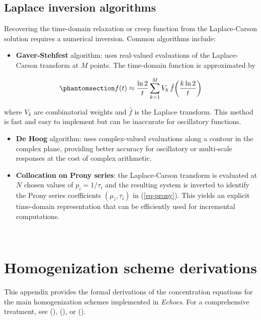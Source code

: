\documentclass[
  a4paper,
  numbers=noendperiod,
  DIV=12]{scrreprt}
\providecommand{\tightlist}{%
  \setlength{\itemsep}{0pt}\setlength{\parskip}{0pt}}
\begin{document}
\section{Laplace inversion algorithms}\label{sec-laplace-inversion}

Recovering the time-domain relaxation or creep function from the
Laplace-Carson solution requires a numerical inversion. Common
algorithms include:

\begin{itemize}
\tightlist
\item
  \textbf{Gaver-Stehfest} algorithm: uses real-valued evaluations of the
  Laplace-Carson transform at \(M\) points. The time-domain function is
  approximated by
\end{itemize}

\begin{equation}\protect\phantomsection\label{eq-stehfest}{
f(t) \approx \frac{\ln 2}{t} \sum_{k=1}^{M} V_k \, \hat{f}\!\left(\frac{k\ln 2}{t}\right)
}\end{equation}

where \(V_k\) are combinatorial weights and \(\hat{f}\) is the Laplace
transform. This method is fast and easy to implement but can be
inaccurate for oscillatory functions.

\begin{itemize}
\item
  \textbf{De Hoog} algorithm: uses complex-valued evaluations along a
  contour in the complex plane, providing better accuracy for
  oscillatory or multi-scale responses at the cost of complex
  arithmetic.
\item
  \textbf{Collocation on Prony series}: the Laplace-Carson transform is
  evaluated at \(N\) chosen values of \(p_i = 1/\tau_i\) and the
  resulting system is inverted to identify the Prony series coefficients
  \((\mu_i, \tau_i)\) in (\ref{eq-prony}). This yields an explicit
  time-domain representation that can be efficiently used for
  incremental computations.
\end{itemize}

\(\,\)

\chapter{Homogenization scheme
derivations}\label{sec-scheme-derivations}

This appendix provides the formal derivations of the concentration
equations for the main homogenization schemes implemented in
\emph{Echoes}. For a comprehensive treatment, see
(),
(), or
().
\end{document}
